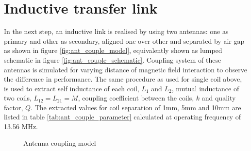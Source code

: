 \documentclass[UKenglish]{ifimaster}  %
\begin{document}
\section{Inductive transfer link}		%

In the next step, an inductive link is realised by using two antennas: one as primary and other as secondary, aligned one over 
other and separated by air gap as shown in figure  \ref{fig:ant_couple_model}, equivalently shown as lumped schematic in 
figure  \ref{fig:ant_couple_schematic}. Coupling system of these antennas is simulated for 
varying distance of magnetic field interaction to observe the difference in performance. The same procedure as 
used for single coil above, is used to extract self inductance of each coil, $L_{1}$ and $L_{2}$, mutual inductance 
of two coils, $ L_{12} = L_{21} = M $, coupling coefficient between the coils, $k$ and quality factor, $Q$. The extracted values for coil separation of 
1mm, 5mm and 10mm are listed in table \ref{tab:ant_couple_parameter} calculated at operating frequency of 13.56 MHz. \\

\begin{figure} [htbp]
  \centering 
\hfill
 \caption{Antenna coupling model} 
\label{fig:ant_couple} 
\end{figure}
\end{document}
